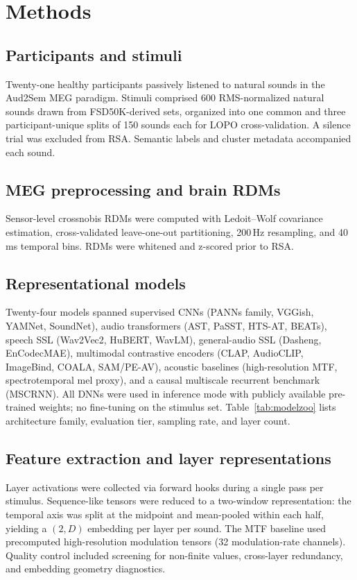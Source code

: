 \documentclass[11pt,a4paper]{article}
\begin{document}
\section{Methods}

\subsection{Participants and stimuli}
Twenty-one healthy participants passively listened to natural sounds in the Aud2Sem MEG paradigm. Stimuli comprised 600 RMS-normalized natural sounds drawn from FSD50K-derived sets, organized into one common and three participant-unique splits of 150 sounds each for LOPO cross-validation. A silence trial was excluded from RSA. Semantic labels and cluster metadata accompanied each sound.

\subsection{MEG preprocessing and brain RDMs}
Sensor-level crossnobis RDMs were computed with Ledoit--Wolf covariance estimation, cross-validated leave-one-out partitioning, 200\,Hz resampling, and 40\,ms temporal bins. RDMs were whitened and z-scored prior to RSA.

\subsection{Representational models}
Twenty-four models spanned supervised CNNs (PANNs family, VGGish, YAMNet, SoundNet), audio transformers (AST, PaSST, HTS-AT, BEATs), speech SSL (Wav2Vec2, HuBERT, WavLM), general-audio SSL (Dasheng, EnCodecMAE), multimodal contrastive encoders (CLAP, AudioCLIP, ImageBind, COALA, SAM/PE-AV), acoustic baselines (high-resolution MTF, spectrotemporal mel proxy), and a causal multiscale recurrent benchmark (MSCRNN). All DNNs were used in inference mode with publicly available pre-trained weights; no fine-tuning on the stimulus set. Table~\ref{tab:modelzoo} lists architecture family, evaluation tier, sampling rate, and layer count.



\subsection{Feature extraction and layer representations}
Layer activations were collected via forward hooks during a single pass per stimulus. Sequence-like tensors were reduced to a two-window representation: the temporal axis was split at the midpoint and mean-pooled within each half, yielding a $(2, D)$ embedding per layer per sound. The MTF baseline used precomputed high-resolution modulation tensors (32 modulation-rate channels). Quality control included screening for non-finite values, cross-layer redundancy, and embedding geometry diagnostics.
\end{document}
